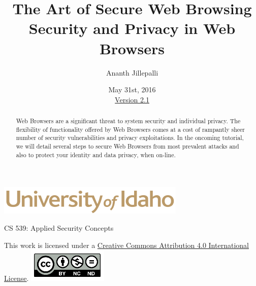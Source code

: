 \documentclass[12pt]{extarticle}
\begin{document}
	\title{ The Art of Secure Web Browsing \\ \large Security and Privacy in Web Browsers}
	\author{Ananth Jillepalli}
	\date{May 31st, 2016 \\ \hyperref[changelog]{Version 2.1}} %
	\renewcommand{\abstractname}{Summary}
	\begin{titlepage}
		\maketitle
		\begin{center}
			\includegraphics[scale=.5]{UofI}
			
			\large{CS 539: Applied Security Concepts}
			
			\vskip 40pt
			
		\end{center}
		\begin{abstract}
			Web Browsers are a significant threat to system security and individual privacy. The flexibility of functionality offered by Web Browsers comes at a cost of rampantly sheer number of security vulnerabilities and privacy exploitations. In the oncoming tutorial, we will detail several steps to secure Web Browsers from most prevalent attacks and also to protect your identity and data privacy, when on-line.
		\end{abstract}
		
		
		\vfill
		\begin{center}
			This work is licensed under a \href{http://creativecommons.org/licenses/by/4.0/}{Creative Commons Attribution 4.0 International License}.
			\vskip 10pt
			\includegraphics[scale=.5]{cc}
		\end{center}
		
	\end{titlepage}
	
	
	\pagebreak
	\tableofcontents
	
	
\end{document}
